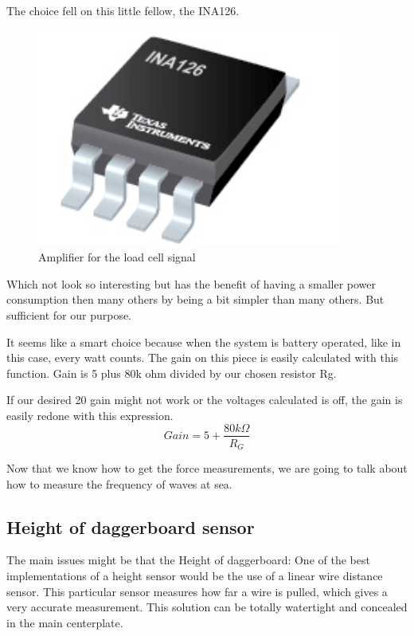 The choice fell on this little fellow, the INA126. 

\begin{figure}[H]
\begin{center}
	\includegraphics[width = 10cm]{Figures/INA126.png}
	\caption{Amplifier for the load cell signal}
	\label{INA126}
\end{center}
\end{figure}


Which not look so interesting but has the benefit of having a smaller power consumption then many others by being a bit simpler than many others. But sufficient for our purpose.

It seems like a smart choice because when the system is battery operated, like in this case, every watt counts.
The gain on this piece is easily calculated with this function. Gain is 5 plus 80k ohm divided by our chosen resistor Rg.



If our desired 20 gain might not work or the voltages calculated is off, the gain is easily redone with this expression.
\begin{equation}
Gain = 5 + \frac{80k\Omega}{R_G}
\end{equation}


Now that we know how to get the force measurements, we are going to talk about how to measure the frequency of waves at sea.


\subsection{Height of daggerboard sensor}

The main issues might be that the Height of daggerboard: 
One of the best implementations of a height sensor would be the use of a linear wire distance sensor. This particular sensor measures how far a wire is pulled, which gives a very accurate measurement. This solution can be totally watertight and concealed in the main centerplate.  

